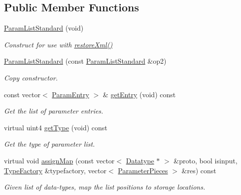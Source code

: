 \subsection*{Public Member Functions}
\begin{DoxyCompactItemize}
\item 
\mbox{\hyperlink{class_param_list_standard_a78acde89ba28272697adefdf14f13a11}{Param\+List\+Standard}} (void)
\begin{DoxyCompactList}\small\item\em Construct for use with \mbox{\hyperlink{class_param_list_standard_a7dc8219ff6422f4e23d12643b68eb100}{restore\+Xml()}} \end{DoxyCompactList}\item 
\mbox{\hyperlink{class_param_list_standard_a0267994ed8c3c3e203b09dde4e7836be}{Param\+List\+Standard}} (const \mbox{\hyperlink{class_param_list_standard}{Param\+List\+Standard}} \&op2)
\begin{DoxyCompactList}\small\item\em Copy constructor. \end{DoxyCompactList}\item 
const vector$<$ \mbox{\hyperlink{class_param_entry}{Param\+Entry}} $>$ \& \mbox{\hyperlink{class_param_list_standard_a2aca7064239033441e64daf86c4de6d0}{get\+Entry}} (void) const
\begin{DoxyCompactList}\small\item\em Get the list of parameter entries. \end{DoxyCompactList}\item 
virtual uint4 \mbox{\hyperlink{class_param_list_standard_a37193293ffb24b1206944e35ef64973c}{get\+Type}} (void) const
\begin{DoxyCompactList}\small\item\em Get the type of parameter list. \end{DoxyCompactList}\item 
virtual void \mbox{\hyperlink{class_param_list_standard_a4819bb8291e202e3d11737d586878525}{assign\+Map}} (const vector$<$ \mbox{\hyperlink{class_datatype}{Datatype}} $\ast$ $>$ \&proto, bool isinput, \mbox{\hyperlink{class_type_factory}{Type\+Factory}} \&typefactory, vector$<$ \mbox{\hyperlink{struct_parameter_pieces}{Parameter\+Pieces}} $>$ \&res) const
\begin{DoxyCompactList}\small\item\em Given list of data-\/types, map the list positions to storage locations. \end{DoxyCompactList}\item 

\end{DoxyCompactItemize}
